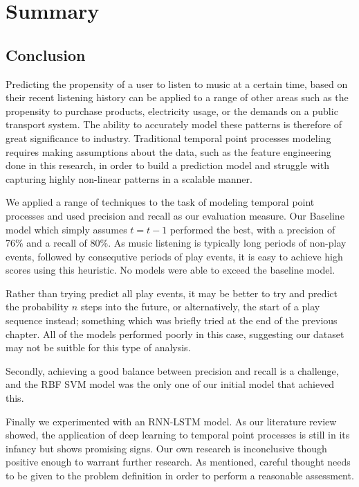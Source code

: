 
\chapter{Summary} %

\label{Chapter6} 

\section{Conclusion}

Predicting the propensity of a user to listen to music at a certain time, based on their recent listening history can be applied to a range of other areas such as the propensity to purchase products, electricity usage, or the demands on a public transport system. The ability to accurately model these patterns is therefore of great significance to industry. Traditional temporal point processes modeling requires making assumptions about the data, such as the feature engineering done in this research, in order to build a prediction model and struggle with capturing highly non-linear patterns in a scalable manner. 

We applied a range of techniques to the task of modeling temporal point processes and used precision and recall as our evaluation measure. Our Baseline model which simply assumes $t = t-1$ performed the best, with a precision of 76\% and a recall of 80\%. As music listening is typically long periods of non-play events, followed by consequtive periods of play events, it is easy to achieve high scores using this heuristic. No models were able to exceed the baseline model.  

Rather than trying predict all play events, it may be better to try and predict the probability $n$ steps into the future, or alternatively,
the start of a play sequence instead; something which was briefly tried at the end of the previous chapter. All of the models performed poorly in this case, suggesting our dataset may not be suitble for this type of analysis.

Secondly, achieving a good balance between precision and recall is a challenge, and the RBF SVM model was the only one of our initial model that achieved this.

Finally we experimented with an RNN-LSTM model. As our literature review showed, the application of deep learning to temporal point processes is still in its infancy but shows promising signs. Our own research is inconclusive though positive enough to warrant further research. As mentioned, careful thought needs to be given to the problem definition in order to perform a reasonable assessment. 


